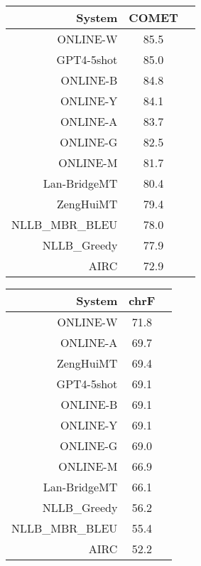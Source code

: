 \documentclass[11pt]{article}
\begin{document}
\begin{table}  
\scriptsize
\begin{subtable}[t]{0.33\textwidth}
\begin{tabular}{rcc}
\toprule 
System  & COMET \\ 
\midrule 
\rowcolor{ashgrey} ONLINE-W   & 85.5 \\ 
\rowcolor{ashgrey} GPT4-5shot   & 85.0 \\ 
\rowcolor{ashgrey} ONLINE-B   & 84.8 \\ 
\rowcolor{ashgrey} ONLINE-Y   & 84.1 \\ 
\rowcolor{ashgrey} ONLINE-A   & 83.7 \\ 
\rowcolor{ashgrey} ONLINE-G   & 82.5 \\ 
\rowcolor{ashgrey} ONLINE-M   & 81.7 \\ 
\rowcolor{ashgrey} Lan-BridgeMT   & 80.4 \\ 
\rowcolor{ashgrey} ZengHuiMT  & 79.4 \\ 
\rowcolor{ashgrey} NLLB\_MBR\_BLEU   & 78.0 \\ 
\rowcolor{ashgrey} NLLB\_Greedy   & 77.9 \\ 
AIRC  & 72.9 \\ 
\bottomrule 
\end{tabular} 
\end{subtable}
\begin{subtable}[t]{0.33\textwidth}
\begin{tabular}{rcc}
\toprule 
System  & chrF \\ 
\midrule 
\rowcolor{ashgrey} ONLINE-W   & 71.8 \\ 
\rowcolor{ashgrey} ONLINE-A   & 69.7 \\ 
\rowcolor{ashgrey} ZengHuiMT   & 69.4 \\ 
\rowcolor{ashgrey} GPT4-5shot   & 69.1 \\ 
\rowcolor{ashgrey} ONLINE-B   & 69.1 \\ 
\rowcolor{ashgrey} ONLINE-Y   & 69.1 \\ 
\rowcolor{ashgrey} ONLINE-G   & 69.0 \\ 
\rowcolor{ashgrey} ONLINE-M   & 66.9 \\ 
\rowcolor{ashgrey} Lan-BridgeMT   & 66.1 \\ 
\rowcolor{ashgrey} NLLB\_Greedy   & 56.2 \\ 
\rowcolor{ashgrey} NLLB\_MBR\_BLEU   & 55.4 \\ 
AIRC  & 52.2 \\ 
\bottomrule 

\end{tabular}
\end{subtable}
\end{table}
\end{document}

